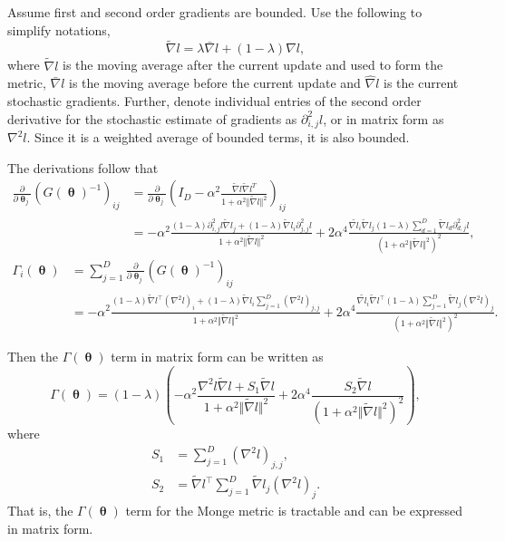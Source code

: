 \documentclass[10pt]{article} %
\DeclareMathOperator{\btheta}{\boldsymbol{\theta}}
\theoremstyle{plain}
\theoremstyle{definition}
\theoremstyle{remark}
\begin{document}
Assume first and second order gradients are bounded.
Use the following to simplify notations,
\begin{equation*}
\tilde{\nabla}l = \lambda \bar{\nabla} l + (1-\lambda)\hat{\nabla} l,
\end{equation*}
where $\tilde{\nabla} l$ is the moving average after the current update and used to form the metric, $\bar{\nabla} l$ is the moving average before the current update and $\hat{\nabla} l$ is the current stochastic gradients. Further, denote individual entries of the second order derivative for the stochastic estimate of gradients as $\partial^{2}_{i,j}l$, or in matrix form as $\nabla^2 l$. Since it is a weighted average of bounded terms, it is also bounded.

The derivations follow that
\begin{align*}
\frac{\partial}{\partial\btheta_{j}}(G(\btheta)^{-1})_{ij} &= \frac{\partial}{\partial\btheta_{j}}(I_{D}-\alpha^{2}\frac{\tilde{\nabla} l \tilde{\nabla} l^{T}}{1+\alpha^{2}\Vert\tilde{\nabla}l\Vert^{2}})_{ij}\\
&= -\alpha^{2}\frac{(1-\lambda)\partial_{i,j}^{2} l \tilde{\nabla}l_{j}+(1-\lambda)\tilde{\nabla}l_{i}\partial_{j,j}^{2}l}{1+\alpha^{2}\Vert\tilde{\nabla}l\Vert^{2}} + 2\alpha^{4}\frac{\tilde{\nabla l_{i}}\tilde{\nabla}l_{j}(1-\lambda)\sum_{d=1}^{D}\tilde{\nabla}l_{d}\partial_{d,j}^{2}l}{(1+\alpha^{2}\Vert\tilde{\nabla}l\Vert^{2})^{2}},
\end{align*}
\begin{align*}
\Gamma_{i}(\btheta) &= \sum_{j=1}^{D} \frac{\partial}{\partial\btheta_{j}}(G(\btheta)^{-1})_{ij}\\
&= -\alpha^{2}\frac{(1-\lambda)\tilde{\nabla}l^{\top} (\nabla^2 l)_{i}+(1-\lambda)\tilde{\nabla}l_{i}\sum_{j=1}^{D}(\nabla^2 l)_{j,j}}{1+\alpha^{2}\Vert\tilde{\nabla}l\Vert^{2}} + 2\alpha^{4}\frac{\tilde{\nabla l_{i}}\tilde{\nabla}l^{\top}(1-\lambda)\sum_{j=1}^{D}\tilde{\nabla}l_{j}(\nabla^2 l)_{j}}{(1+\alpha^{2}\Vert\tilde{\nabla}l\Vert^{2})^{2}}.
\end{align*}

Then the $\Gamma(\btheta)$ term in matrix form can be written as
\begin{equation*}
\Gamma(\btheta) = (1-\lambda) \left(-\alpha^{2}\frac{\nabla^2 l\tilde{\nabla}l+S_{1}\tilde{\nabla}l}{1+\alpha^{2}\Vert\tilde{\nabla}l\Vert^{2}}+2\alpha^{4}\frac{S_{2}\tilde{\nabla}l}{(1+\alpha^{2}\Vert\tilde{\nabla}l\Vert^{2})^{2}}\right),
\end{equation*}
where
\begin{align*}
S_{1} &= \sum_{j=1}^{D}(\nabla^2 l)_{j,j},\\
S_{2} &= \tilde{\nabla}l^{\top}\sum_{j=1}^{D}\tilde{\nabla}l_{j
}(\nabla^2 l)_{j}.
\end{align*}
That is, the $\Gamma(\btheta)$ term for the Monge metric is tractable and can be expressed in matrix form.
\end{document}
